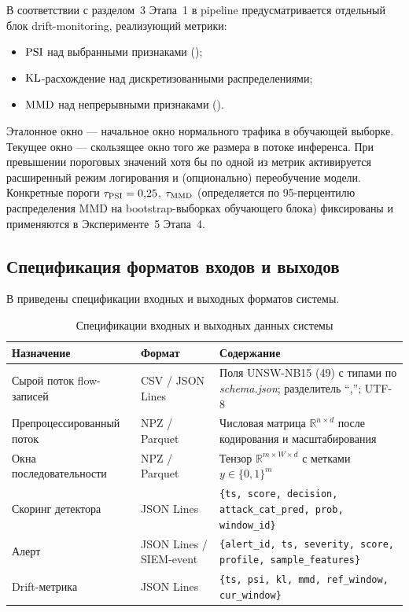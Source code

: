 В соответствии с разделом~3 Этапа~1 в pipeline предусматривается отдельный
блок drift-monitoring, реализующий метрики:
\begin{itemize}
    \item \(\operatorname{PSI}\) над выбранными признаками ();
    \item \(\operatorname{KL}\)-расхождение над дискретизованными распределениями;
    \item \(\operatorname{MMD}\) над непрерывными признаками
    ().
\end{itemize}

Эталонное окно --- начальное окно нормального трафика в обучающей выборке.
Текущее окно --- скользящее окно того же размера в потоке инференса. При
превышении пороговых значений хотя бы по одной из метрик активируется
расширенный режим логирования и (опционально) переобучение модели.
Конкретные пороги \(\tau_{\operatorname{PSI}} = 0{,}25\), \(\tau_{\operatorname{MMD}}\) (определяется
по 95-перцентилю распределения MMD на bootstrap-выборках обучающего
блока) фиксированы и применяются в Эксперименте~5 Этапа~4.

\subsection{Спецификация форматов входов и выходов}

В  приведены спецификации входных и выходных форматов
системы.

\begin{table}[H]
\centering
\caption{Спецификации входных и выходных данных системы}
\label{tab:io-spec}
\renewcommand{\arraystretch}{1.25}
\begin{tabularx}{\linewidth}{@{}llX@{}}
\toprule
\textbf{Назначение} & \textbf{Формат} & \textbf{Содержание} \\
\midrule
Сырой поток flow-записей &
CSV / JSON Lines &
Поля UNSW-NB15 (49) с типами по \emph{schema.json}; разделитель ``,''; UTF-8 \\
\addlinespace
Препроцессированный поток &
NPZ / Parquet &
Числовая матрица \(\mathbb{R}^{n \times d}\) после кодирования и масштабирования \\
\addlinespace
Окна последовательности &
NPZ / Parquet &
Тензор \(\mathbb{R}^{m \times W \times d}\) с метками \(y \in \{0,1\}^m\) \\
\addlinespace
Скоринг детектора &
JSON Lines &
\texttt{\{ts, score, decision, attack\_cat\_pred, prob, window\_id\}} \\
\addlinespace
Алерт &
JSON Lines / SIEM-event &
\texttt{\{alert\_id, ts, severity, score, profile, sample\_features\}} \\
\addlinespace
Drift-метрика &
JSON Lines &
\texttt{\{ts, psi, kl, mmd, ref\_window, cur\_window\}} \\
\bottomrule
\end{tabularx}
\end{table}

